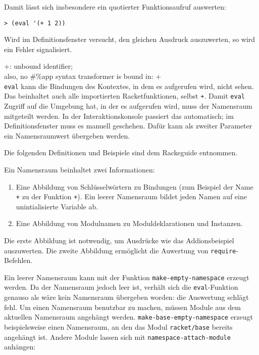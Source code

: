 Damit lässt sich insbesondere ein quotierter Funktionsaufruf auswerten:

\begin{lstlisting}
> (eval '(+ 1 2))
\end{lstlisting}
{}

Wird im Definitionsfenster versucht, den gleichen Ausdruck auszuwerten, so wird ein Fehler signalisiert.

{\color{red}\ttfamily\small\hspace{5pt} +: unbound identifier;}\\
{\color{red}\ttfamily\small\hspace{5pt} also, no \#\%app syntax transformer is bound in: +}\\

\texttt{eval} kann die Bindungen des Kontextes, in dem es aufgerufen wird, nicht sehen. Das beinhaltet auch alle importierten Racketfunktionen, selbst \texttt{+}. Damit \texttt{eval} Zugriff auf die Umgebung hat, in der es aufgerufen wird, muss der Namensraum mitgeteilt werden. In der Interaktionskonsole passiert das automatisch; im Definitionsfenster muss es manuell geschehen. Dafür kann als zweiter Parameter ein Namensraumwert übergeben werden. 

Die folgenden Definitionen und Beispiele sind dem Rackeguide \cite{racketguide-namespace} entnommen.

Ein Namensraum beinhaltet zwei Informationen:
\begin{enumerate}
 \item Eine Abbildung von Schlüsselwörtern zu Bindungen (zum Beispiel der Name \texttt{+} zu der Funktion \texttt{+}). Ein leerer Namensraum bildet jeden Namen auf eine unintialisierte Variable ab.
 \item Eine Abbildung von Modulnamen zu Moduldeklarationen und Instanzen.
\end{enumerate}

Die erste Abbildung ist notwendig, um Ausdrücke wie das Addionsbeispiel auszuwerten. Die zweite Abbildung ermöglicht die Auwertung von \texttt{require}-Befehlen.

Ein leerer Namensraum kann mit der Funktion \texttt{make-empty-namespace} erzeugt werden. Da der Namensraum jedoch leer ist, verhält sich die \texttt{eval}-Funktion genauso als wäre kein Namensraum übergeben worden: die Auswertung schlägt fehl. Um einen Namensraum benutzbar zu machen, müssen Module aus dem aktuellen Namensraum angehängt werden. \texttt{make-base-empty-namespace} erzeugt beispielsweise einen Namensraum, an den das Modul \texttt{racket/base} bereits angehängt ist. Andere Module lassen sich mit \texttt{namespace-attach-module} anhängen:

